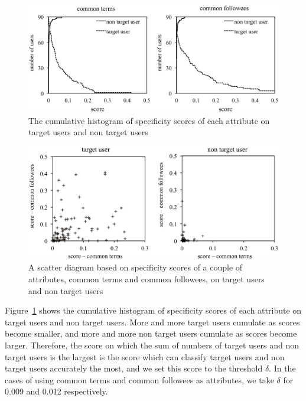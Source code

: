 {\footnotesize
\begin{figure}[t]
\begin{center}
\includegraphics[width=14cm]{images/cumulativehistogram.eps}
 \caption{The cumulative histogram of specificity scores of each
 attribute on target users and non target users}
\label{fig:cumulativehistogram}
\end{center}
\end{figure}
}

{\footnotesize
\begin{figure}[t]
\begin{center}
\includegraphics[width=14cm]{images/distribution.eps}
 \caption{A scatter diagram based on specificity scores of a couple of
 attributes, common terms and common followees, on target users and non
 target users}
\label{fig:distribution}
\end{center}
\end{figure}
}

Figure~\ref{fig:cumulativehistogram} shows the cumulative histogram of
specificity scores of each attribute on target users and non target
users.  More and more target users cumulate as scores become smaller,
and more and more non target users cumulate as scores become larger.
Therefore, the score on which the sum of numbers of target users and non
target users is the largest is the score which can classify target
users and non target users accurately the most, and we set this score
to the threshold $\delta$.  In the cases of using common terms and
common followees as attributes, we take $\delta$ for 0.009 and 0.012
respectively.

